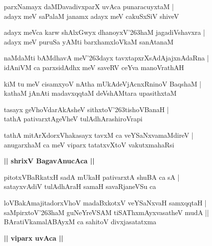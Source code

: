 \documentclass[twoside,12pt,openright]{book}
\def\S{\char'263}
\newcounter{shloka}[chapter]
\def\uvaca#1{\centerline{{\large\textbf{#1}}}}
\begin{document}
\begin{shloka}%
parxNamayx daMDavadivxparX uvAca punaracuyxtaM |\\
adayx meV saPalaM janamx adayx meV cakuSxSiV shiveV 
\end{shloka}

\begin{shloka}%
adayx meVca karw shAlxGwyx dhanoyxV\S haM jagadiVshavxra |\\
adayx meV puruSa yAMti barxhamxloVkaM sanAtanaM 
\end{shloka}

\begin{shloka}%
naMdaMti bAMdhavA meV\S dayx tavxtapxrXsAdAjajxnAdaRna |\\
idAniVM ca parxsidAdhx meV saveRV ceYva manoVrathAH
\end{shloka}

\begin{shloka}%
kiM tu meV cisamxyoV nAtha mUkAdeVjAcnxRninoV BaqshaM |\\
kathaM jAnAti madavxqqtaM deVshAMtara upasithxtaM
\end{shloka}

\begin{shloka}%
tasayx geVhoVdarAkAsheV sithxtoV\S tishoVBanaH |\\
tathA pativarxtAgeVheV tulAdhArashiroVrapi
\end{shloka}

\begin{shloka}%
tathA mitArXdorxVhakasayx tavxM ca veYSaNxvamaMdireV |\\
anugarxhaM ca meV viparx tatatxvXtoV vakutxmahaRsi
\end{shloka}

\uvaca{|| shrixV BagavAnucAca ||}

\begin{shloka}%
pitotxVBaRkatxH sadA mUkaH pativarxtA shuBA ca sA |\\
satayxvAdiV tulAdhAraH samaH savaRjaneVSu ca
\end{shloka}

\begin{shloka}%
loVBakAmajitadorxVhoV madaBxkotxV veYSaNxvaH samxqqtaH |\\
saMpirxtoV\S haM guNeYreVSAM tiSAThxmAyxvasatheV mudA ||\\
BAratiVkamalABAyxM ca sahitoV divxjasatatxma
\end{shloka}

\uvaca{|| viparx uvAca ||}
\end{document}
